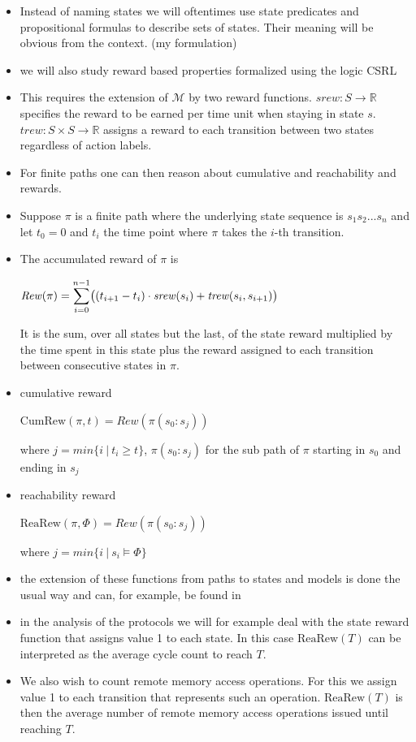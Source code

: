 \documentclass[a4paper, 10pt]{article}
\begin{document}
\begin{itemize}
	\item Instead of naming states we will oftentimes use state predicates and propositional formulas to describe sets of states. Their meaning will be obvious from the context. (my formulation)
	\item we will also study reward based properties formalized using the logic CSRL \cite{bhhk00, knp07}
	\item This requires the extension of $\mathcal{M}$ by two reward functions. $\mathit{srew} : S \rightarrow \mathbb{R}$ specifies the reward to be earned per time  unit when staying in state $s$. $\mathit{trew} : S \times S \rightarrow \mathbb{R}$ assigns a reward to each transition between two states regardless of action labels.
	\item For finite paths one can then reason about cumulative and reachability and rewards.
	\item Suppose $\pi$ is a finite path where the underlying state sequence is $s_1 s_2 ...s_n$ and let $t_0 = 0$ and $t_i$ the time point where $\pi$ takes the $i$-th transition.
	\item The accumulated reward of $\pi$ is
		\begin{center}
			$\mathit{Rew}(\pi) = \mathlarger{\sum}\limits_{i=0}^{n-1} \big( (t_{i+1} - t_i) \cdot \mathit{srew}(s_i) + \mathit{trew}(s_i, s_{i+1}) \big)$
		\end{center}
		It is the sum, over all states but the last, of the state reward multiplied by the time spent in this state plus the reward assigned to each transition between consecutive states in $\pi$.
	\item cumulative reward
		\begin{center}
			$\mathrm{CumRew}(\pi, t) = \mathit{Rew}(\pi(s_0:s_j))$
		\end{center}
		where $j = min \{ i~|~t_i \ge t \}$, $\pi(s_0:s_j)$ for the sub path of $\pi$ starting in $s_0$ and ending in $s_j$
	\item reachability reward
		\begin{center}
			$\mathrm{ReaRew}(\pi, \Phi) = \mathit{Rew}(\pi(s_0:s_j))$
		\end{center}
		where $j = min \{ i~|~s_i \models \Phi \}$
	\item the extension of these functions from paths to states and models is done the usual way and can, for example, be found in \cite{bhhk03}
	\item in the analysis of the protocols we will for example deal with the state reward function that assigns value 1 to each state. In this case $\mathrm{ReaRew}(T)$ can be interpreted as the average cycle count to reach $T$.
	\item We also wish to count remote memory access operations. For this we assign value 1 to each transition that represents such an operation. $\mathrm{ReaRew}(T)$ is then the average number of remote memory access operations issued until reaching $T$.
\end{itemize}
\end{document}
